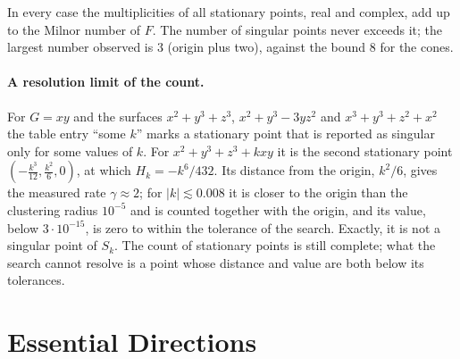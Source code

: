 In every case the multiplicities of all stationary points, real and complex,
add up to the Milnor number of $F$. The number of singular points never exceeds
it; the largest number observed is $3$ (origin plus two), against the bound $8$
for the cones.

\paragraph{A resolution limit of the count.} For $G=xy$ and the surfaces
$x^2+y^3+z^3$, $x^2+y^3-3yz^2$ and $x^3+y^3+z^2+x^2$ the table entry ``some $k$''
marks a stationary point that is reported as singular only for some values of
$k$. For $x^2+y^3+z^3+kxy$ it is the second stationary point
$(-\frac{k^3}{12},\frac{k^2}{6},0)$, at which $H_k=-k^6/432$. Its distance from
the origin, $k^2/6$, gives the measured rate $\gamma\approx2$; for
$|k|\lesssim0.008$ it is closer to the origin than the clustering radius
$10^{-5}$ and is counted together with the origin, and its value, below
$3\cdot10^{-15}$, is zero to within the tolerance of the search. Exactly, it is
not a singular point of $S_k$. The count of stationary points is still
complete; what the search cannot resolve is a point whose distance and value
are both below its tolerances.

\section{Essential Directions}
\label{sec:exp-essential}

